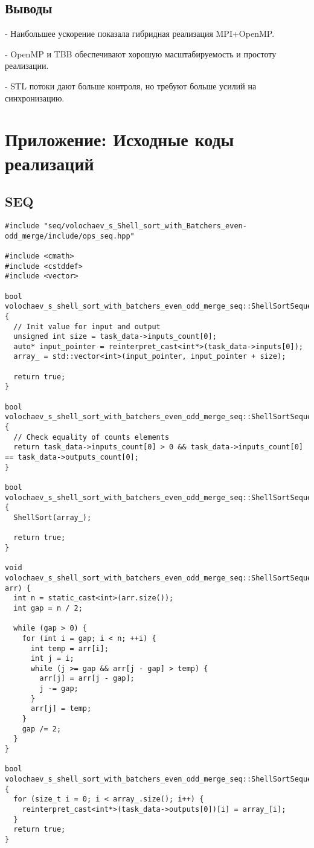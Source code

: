 \documentclass[12pt]{article}
\begin{document}
\subsection*{Выводы}

    
- Наибольшее ускорение показала гибридная реализация MPI+OpenMP.
    
- OpenMP и TBB обеспечивают хорошую масштабируемость и простоту реализации.
    
- STL потоки дают больше контроля, но требуют больше усилий на синхронизацию.


\appendix
\section*{Приложение: Исходные коды реализаций}
\subsection*{SEQ}
\begin{lstlisting}
#include "seq/volochaev_s_Shell_sort_with_Batchers_even-odd_merge/include/ops_seq.hpp"

#include <cmath>
#include <cstddef>
#include <vector>

bool volochaev_s_shell_sort_with_batchers_even_odd_merge_seq::ShellSortSequential::PreProcessingImpl() {
  // Init value for input and output
  unsigned int size = task_data->inputs_count[0];
  auto* input_pointer = reinterpret_cast<int*>(task_data->inputs[0]);
  array_ = std::vector<int>(input_pointer, input_pointer + size);

  return true;
}

bool volochaev_s_shell_sort_with_batchers_even_odd_merge_seq::ShellSortSequential::ValidationImpl() {
  // Check equality of counts elements
  return task_data->inputs_count[0] > 0 && task_data->inputs_count[0] == task_data->outputs_count[0];
}

bool volochaev_s_shell_sort_with_batchers_even_odd_merge_seq::ShellSortSequential::RunImpl() {
  ShellSort(array_);

  return true;
}

void volochaev_s_shell_sort_with_batchers_even_odd_merge_seq::ShellSortSequential::ShellSort(std::vector<int>& arr) {
  int n = static_cast<int>(arr.size());
  int gap = n / 2;

  while (gap > 0) {
    for (int i = gap; i < n; ++i) {
      int temp = arr[i];
      int j = i;
      while (j >= gap && arr[j - gap] > temp) {
        arr[j] = arr[j - gap];
        j -= gap;
      }
      arr[j] = temp;
    }
    gap /= 2;
  }
}

bool volochaev_s_shell_sort_with_batchers_even_odd_merge_seq::ShellSortSequential::PostProcessingImpl() {
  for (size_t i = 0; i < array_.size(); i++) {
    reinterpret_cast<int*>(task_data->outputs[0])[i] = array_[i];
  }
  return true;
}
\end{lstlisting}
\end{document}
